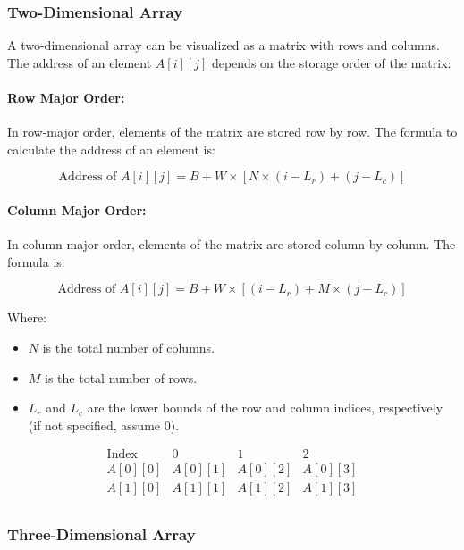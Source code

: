 \documentclass{book}
\begin{document}
\subsubsection{Two-Dimensional Array}

A two-dimensional array can be visualized as a matrix with rows and columns. The address of an element \( A[i][j] \) depends on the storage order of the matrix:

\paragraph{Row Major Order:}

In row-major order, elements of the matrix are stored row by row. The formula to calculate the address of an element is:

\[
\text{Address of } A[i][j] = B + W \times \left[ N \times (i - L_r) + (j - L_c) \right]
\]

\paragraph{Column Major Order:}

In column-major order, elements of the matrix are stored column by column. The formula is:

\[
\text{Address of } A[i][j] = B + W \times \left[ (i - L_r) + M \times (j - L_c) \right]
\]

Where:
\begin{itemize}
	\item \( N \) is the total number of columns.
	\item \( M \) is the total number of rows.
	\item \( L_r \) and \( L_c \) are the lower bounds of the row and column indices, respectively (if not specified, assume 0).
\end{itemize}

\[
\begin{array}{c|c|c|c}
	\text{Index} & 0 & 1 & 2 \\
	\hline
	A[0][0] & A[0][1] & A[0][2] & A[0][3] \\
	\hline
	A[1][0] & A[1][1] & A[1][2] & A[1][3] \\
\end{array}
\]

\subsubsection{Three-Dimensional Array}
\end{document}
